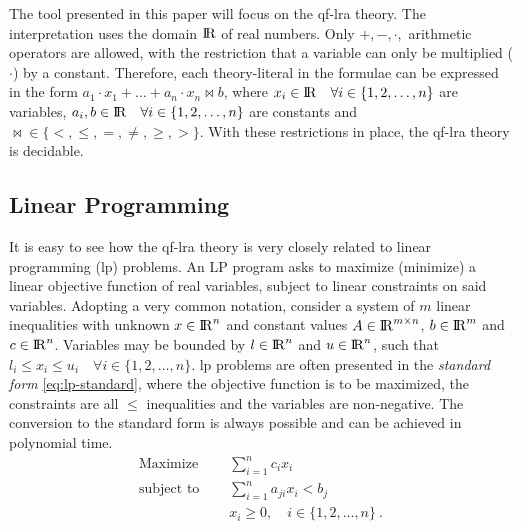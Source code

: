 \documentclass[runningheads]{llncs}
\begin{document}
The tool presented in this paper will focus on the \gls{qf-lra} theory.
The interpretation uses the domain ${\rm I\!R}$ of real numbers.
Only $+, -, \cdot,$ arithmetic operators are allowed, with the restriction that a variable can only be multiplied ($\cdot$) by a constant.
Therefore, each theory-literal in the formulae can be expressed in the form $a_1 \cdot x_1 + \ldots + a_n \cdot x_n \bowtie b$, where $x_i \in {\rm I\!R} \quad \forall i \in \{1, 2, \dots, n\}$ are variables, $a_i, b \in {\rm I\!R} \quad \forall i \in \{1, 2, \dots, n\}$ are constants and $\bowtie \in \{<, \le, =, \ne, \ge, >\}$.
With these restrictions in place, the \gls{qf-lra} theory is decidable.

\subsection{Linear Programming}
\label{sec:lp}

It is easy to see how the \gls{qf-lra} theory is very closely related to linear programming (\gls{lp}) problems.
An LP program asks to maximize (minimize) a linear objective function of real variables, subject to linear constraints on said variables.
Adopting a very common notation, consider a system of $m$ linear inequalities with unknown $x \in {\rm I\!R}^n$ and constant values $A \in {\rm I\!R}^{m \times n}$, $b \in {\rm I\!R}^m$ and $c \in {\rm I\!R}^n$.
Variables may be bounded by $l \in {\rm I\!R}^n$ and $u \in {\rm I\!R}^n$, such that $l_i \le x_i \le u_i \quad \forall i \in \{1, 2, \ldots, n\}$.
\gls{lp} problems are often presented in the \textit{standard form} \eqref{eq:lp-standard}, where the objective function is to be maximized, the constraints are all $\le$ inequalities and the variables are non-negative.
The conversion to the standard form is always possible and can be achieved in polynomial time.
\begin{equation}
    \label{eq:lp-standard}
    \begin{split}
        \text{Maximize }   \quad & \sum_{i=1}^{n} c_i x_i                      \\
        \text{subject to } \quad & \sum_{i=1}^{n} a_{ji}x_{i} < b_j            \\
        & x_i \ge 0,  \quad i \in \{1, 2, \ldots, n\}\ .
    \end{split}
\end{equation}
\end{document}
